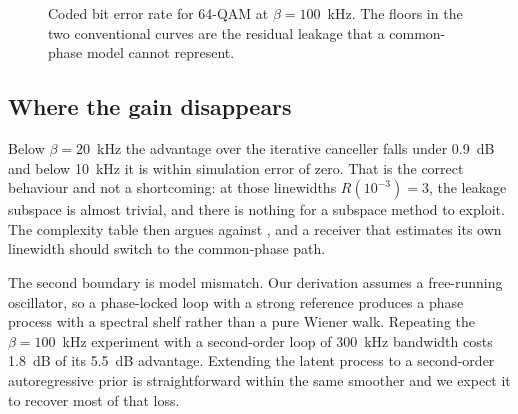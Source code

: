 \begin{figure}[t]
  \centering
  \caption{Coded bit error rate for 64-QAM at $\beta = 100$~kHz. The floors in
  the two conventional curves are the residual leakage that a common-phase
  model cannot represent.}
  \label{fig:ber}
\end{figure}

\subsection{Where the gain disappears}

Below $\beta = 20$~kHz the advantage over the iterative canceller falls under
0.9~dB and below 10~kHz it is within simulation error of zero. That is the
correct behaviour and not a shortcoming: at those linewidths
$R(10^{-3}) = 3$, the leakage subspace is almost trivial, and there is nothing
for a subspace method to exploit. The complexity table then argues against
\est, and a receiver that estimates its own linewidth should switch to the
common-phase path.

The second boundary is model mismatch. Our derivation assumes a free-running
oscillator, so a phase-locked loop with a strong reference produces a
phase process with a spectral shelf rather than a pure Wiener walk. Repeating
the $\beta = 100$~kHz experiment with a second-order loop of 300~kHz bandwidth
costs \est{} 1.8~dB of its 5.5~dB advantage. Extending the latent process to a
second-order autoregressive prior is straightforward within the same smoother
and we expect it to recover most of that loss.
